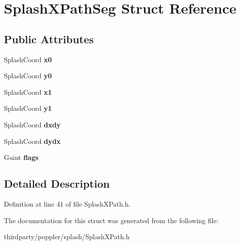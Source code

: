 \hypertarget{struct_splash_x_path_seg}{}\section{Splash\+X\+Path\+Seg Struct Reference}
\label{struct_splash_x_path_seg}
\subsection*{Public Attributes}
\begin{DoxyCompactItemize}
\item 
\mbox{\label{struct_splash_x_path_seg_a5edf1220650478338636ad7f8b17e24f}} 
Splash\+Coord {\bfseries x0}
\item 
\mbox{\label{struct_splash_x_path_seg_aa3600b10fc2dde4992e6d9c4261a0c78}} 
Splash\+Coord {\bfseries y0}
\item 
\mbox{\label{struct_splash_x_path_seg_afc8ab0e134a2fa5ec0354359b9b70ccc}} 
Splash\+Coord {\bfseries x1}
\item 
\mbox{\label{struct_splash_x_path_seg_a5369c40e6a6fb4c47cb9b229e866c14a}} 
Splash\+Coord {\bfseries y1}
\item 
\mbox{\label{struct_splash_x_path_seg_aae36cf9af172ca8a8b6c103f7cd7a11f}} 
Splash\+Coord {\bfseries dxdy}
\item 
\mbox{\label{struct_splash_x_path_seg_af0967063f8bf06000340aead5dfa90bc}} 
Splash\+Coord {\bfseries dydx}
\item 
\mbox{\label{struct_splash_x_path_seg_a4cba829fc101fd64a01cec643df6f6c6}} 
Guint {\bfseries flags}
\end{DoxyCompactItemize}


\subsection{Detailed Description}


Definition at line 41 of file Splash\+X\+Path.\+h.



The documentation for this struct was generated from the following file\+:\begin{DoxyCompactItemize}
\item 
thirdparty/poppler/splash/Splash\+X\+Path.\+h\end{DoxyCompactItemize}
